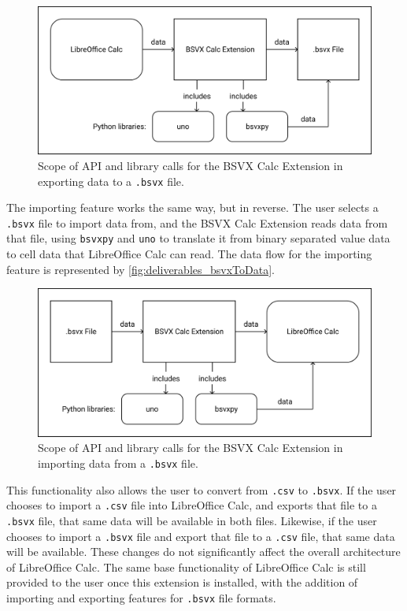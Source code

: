 \documentclass[10pt]{article}
\begin{document}
\begin{figure}[H]
\centering
\includegraphics[width=5in]{figures/dataToBsvx.png}
\caption{Scope of API and library calls for the BSVX Calc Extension in exporting data to a \texttt{.bsvx} file.}
\label{fig:deliverables_dataToBsvx}
\end{figure}

\indent{}
The importing feature works the same way, but in reverse.
The user selects a \texttt{.bsvx} file to import data from, and the BSVX Calc Extension reads data from that file, using \texttt{bsvxpy} and \texttt{uno} to translate it from binary separated value data to cell data that LibreOffice Calc can read.
The data flow for the importing feature is represented by \autoref{fig:deliverables_bsvxToData}.
    
\begin{figure}[H]
\centering
\includegraphics[width=5in]{figures/bsvxToData.png}
\caption{Scope of API and library calls for the BSVX Calc Extension in importing data from a \texttt{.bsvx} file.}
\label{fig:deliverables_bsvxToData}
\end{figure}

\indent{}
This functionality also allows the user to convert from \texttt{.csv} to \texttt{.bsvx}.
If the user chooses to import a \texttt{.csv} file into LibreOffice Calc, and exports that file to a \texttt{.bsvx} file, that same data will be available in both files.
Likewise, if the user chooses to import a \texttt{.bsvx} file and export that file to a \texttt{.csv} file, that same data will be available.
These changes do not significantly affect the overall architecture of LibreOffice Calc.
The same base functionality of LibreOffice Calc is still provided to the user once this extension is installed, with the addition of importing and exporting features for \texttt{.bsvx} file formats.
\end{document}
